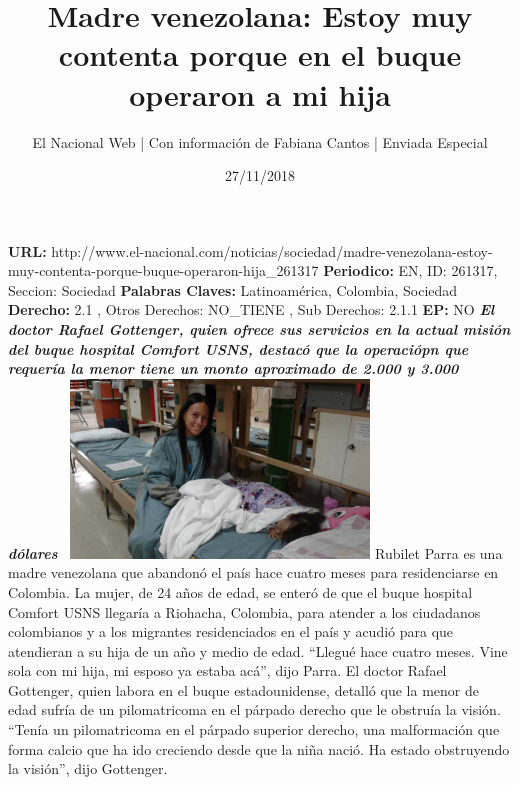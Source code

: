 \documentclass{article}%
\title{\textbf{Madre venezolana: Estoy muy contenta porque en el buque operaron a mi hija}}%
\author{El Nacional Web | Con información de Fabiana Cantos | Enviada Especial}%
\date{27/11/2018}%
\begin{document}
%
\normalsize%
\maketitle%
\textbf{URL: }%
http://www.el{-}nacional.com/noticias/sociedad/madre{-}venezolana{-}estoy{-}muy{-}contenta{-}porque{-}buque{-}operaron{-}hija\_261317\newline%
%
\textbf{Periodico: }%
EN, %
ID: %
261317, %
Seccion: %
Sociedad\newline%
%
\textbf{Palabras Claves: }%
Latinoamérica, Colombia, Sociedad\newline%
%
\textbf{Derecho: }%
2.1%
, Otros Derechos: %
NO\_TIENE%
, Sub Derechos: %
2.1.1%
\newline%
%
\textbf{EP: }%
NO\newline%
\newline%
%
\textbf{\textit{El doctor Rafael Gottenger, quien ofrece sus servicios en la actual misión del buque hospital Comfort USNS, destacó que la operaciópn que requería la menor tiene un monto aproximado de 2.000 y 3.000 dólares~}}%
\newline%
\newline%
%
\includegraphics[width=300px]{25.jpg}%
\newline%
%
Rubilet Parra es una madre venezolana que abandonó el país hace cuatro meses para residenciarse en Colombia. La mujer, de 24 años de edad, se enteró de que el buque hospital Comfort USNS llegaría a Riohacha, Colombia, para atender a los ciudadanos colombianos y a los migrantes residenciados en el país y acudió para que atendieran a su hija de un año y medio de edad.%
\newline%
%
“Llegué hace cuatro meses. Vine sola con mi hija, mi esposo ya estaba acá”, dijo Parra.%
\newline%
%
El doctor Rafael Gottenger, quien labora en el buque estadounidense, detalló que la menor de edad sufría de un pilomatricoma en el párpado derecho que le obstruía la visión.%
\newline%
%
“Tenía un pilomatricoma en el párpado superior derecho, una malformación que forma calcio que ha ido creciendo desde que la niña nació. Ha estado obstruyendo la visión”, dijo Gottenger.%
\end{document}
